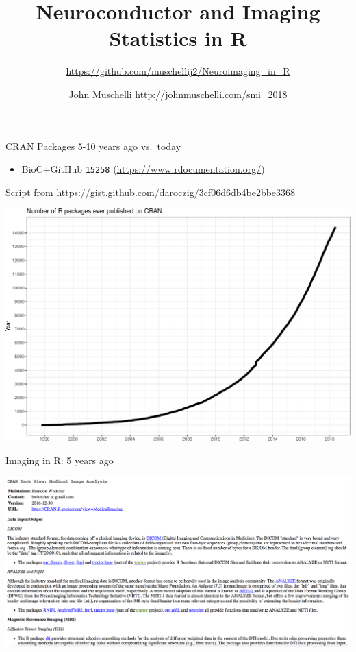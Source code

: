 \documentclass[ignorenonframetext,]{beamer}
\title{Neuroconductor and Imaging Statistics in R}
\subtitle{\url{https://github.com/muschellij2/Neuroimaging_in_R}}
\author{John Muschelli \url{http://johnmuschelli.com/smi_2018}}
\date{}
\providecommand{\tightlist}{%
  \setlength{\itemsep}{0pt}\setlength{\parskip}{0pt}}
\begin{document}
\frame{\titlepage}

\begin{frame}[fragile]

\begin{block}{CRAN Packages 5-10 years ago vs.~today}

\begin{itemize}
\tightlist
\item
  BioC+GitHub \texttt{15258} (\url{https://www.rdocumentation.org/})
\end{itemize}

Script from \url{https://gist.github.com/daroczig/3cf06d6db4be2bbe3368}

\includegraphics{index_files/figure-beamer/unnamed-chunk-1-1.pdf}

\end{block}

\begin{block}{Imaging in R: 5 years ago}

\includegraphics[width=0.95\linewidth]{figure/imaging_task_view}

\end{block}

\end{frame}
\end{document}
